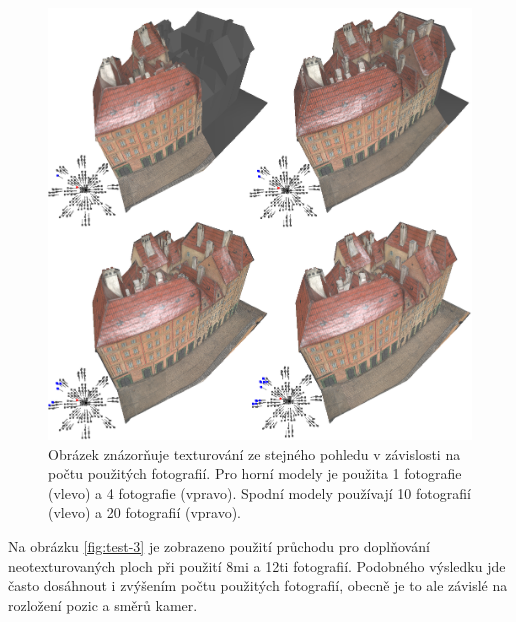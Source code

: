 \documentclass[11pt,twoside,a4paper]{book}
\begin{document}
\begin{figure}[h!]
\begin{center}
\includegraphics[width=\textwidth]{figures/test-2}
\caption{Obrázek znázorňuje texturování ze stejného pohledu v závislosti na počtu použitých fotografií. Pro horní modely je použita 1 fotografie (vlevo) a 4 fotografie (vpravo). Spodní modely používají 10 fotografií (vlevo) a 20 fotografií (vpravo).}
\label{fig:test-2}
\end{center}
\end{figure}

Na  obrázku \ref{fig:test-3} je zobrazeno použití průchodu pro doplňování neotexturovaných ploch při použití 8mi a 12ti fotografií. Podobného výsledku jde často dosáhnout i zvýšením počtu použitých fotografií, obecně je to ale závislé na rozložení pozic a směrů kamer.
\end{document}
